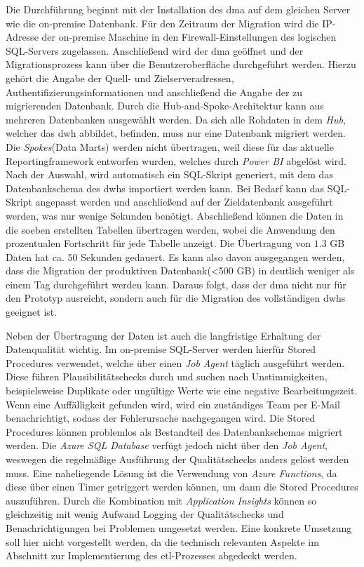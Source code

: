 Die Durchführung beginnt mit der Installation des \ac{dma} auf dem gleichen Server wie die on-premise Datenbank. Für den Zeitraum der Migration wird die IP-Adresse der on-premise Maschine in den Firewall-Einstellungen des logischen SQL-Servers zugelassen. Anschließend wird der \ac{dma} geöffnet und der Migrationsprozess kann über die Benutzeroberfläche durchgeführt werden. Hierzu gehört die Angabe der Quell- und Zielserveradressen, Authentifizierungsinformationen und anschließend die Angabe der zu migrierenden Datenbank. Durch die Hub-and-Spoke-Architektur kann aus mehreren Datenbanken ausgewählt werden. Da sich alle Rohdaten in dem \textit{Hub}, welcher das \ac{dwh} abbildet, befinden, muss nur eine Datenbank migriert werden. Die \textit{Spokes}(Data Marts) werden nicht übertragen, weil diese für das aktuelle Reportingframework entworfen wurden, welches durch \textit{Power BI} abgelöst wird. Nach der Auswahl, wird automatisch ein SQL-Skript generiert, mit dem das Datenbankschema des \acp{dwh} importiert werden kann. Bei Bedarf kann das SQL-Skript angepasst werden und anschließend auf der Zieldatenbank ausgeführt werden, was nur wenige Sekunden benötigt. Abschließend können die Daten in die soeben erstellten Tabellen übertragen werden, wobei die Anwendung den prozentualen Fortschritt für jede Tabelle anzeigt. Die Übertragung von $1.3$ GB Daten hat ca. 50 Sekunden gedauert. Es kann also davon ausgegangen werden, dass die Migration der produktiven Datenbank(<500 GB) in deutlich weniger als einem Tag durchgeführt werden kann. Daraus folgt, dass der \ac{dma} nicht nur für den Prototyp ausreicht, sondern auch für die Migration des vollständigen \acp{dwh} geeignet ist.

Neben der Übertragung der Daten ist auch die langfristige Erhaltung der Datenqualität wichtig. Im on-premise SQL-Server werden hierfür Stored Procedures verwendet, welche über einen \textit{Job Agent} täglich ausgeführt werden. Diese führen Plausibilitätschecks durch und suchen nach Unstimmigkeiten, beispielsweise Duplikate oder ungültige Werte wie eine negative Bearbeitungszeit. Wenn eine Auffälligkeit gefunden wird, wird ein zuständiges Team per E-Mail benachrichtigt, sodass der Fehlerursache nachgegangen wird. Die Stored Procedures können problemlos als Bestandteil des Datenbankschemas migriert werden. Die \textit{Azure SQL Database} verfügt jedoch nicht über den \textit{Job Agent}, weswegen die regelmäßige Ausführung der Qualitätschecks anders gelöst werden muss. Eine naheliegende Lösung ist die Verwendung von \textit{Azure Functions}, da diese über einen Timer getriggert werden können, um dann die Stored Procedures auszuführen. Durch die Kombination mit \textit{Application Insights} können so gleichzeitig mit wenig Aufwand Logging der Qualitätschecks und Benachrichtigungen bei Problemen umgesetzt werden. Eine konkrete Umsetzung soll hier nicht vorgestellt werden, da die technisch relevanten Aspekte im Abschnitt zur Implementierung des \ac{etl}-Prozesses abgedeckt werden.

